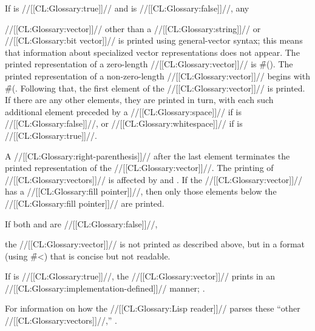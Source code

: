 \endsubsubsection%


If  is //[[CL:Glossary:true]]//  and  is //[[CL:Glossary:false]]//, any

//[[CL:Glossary:vector]]//  other than a //[[CL:Glossary:string]]// or //[[CL:Glossary:bit vector]]// is printed using general-vector syntax; this means that information about specialized vector representations does not appear. The printed representation of a zero-length //[[CL:Glossary:vector]]// is \f{\#()}. The printed representation of a non-zero-length //[[CL:Glossary:vector]]// begins with \f{\#(}. Following that, the first element of the //[[CL:Glossary:vector]]// is printed.    If there are any other elements, they are printed in turn, with  each such additional element preceded by a //[[CL:Glossary:space]]// if  is //[[CL:Glossary:false]]//, or //[[CL:Glossary:whitespace]]// if  is //[[CL:Glossary:true]]//.

A //[[CL:Glossary:right-parenthesis]]// after the last element terminates the printed representation of the //[[CL:Glossary:vector]]//.  The printing of //[[CL:Glossary:vectors]]//  is affected by  and . If the //[[CL:Glossary:vector]]// has a //[[CL:Glossary:fill pointer]]//,  then only those elements below the //[[CL:Glossary:fill pointer]]// are printed.


If both  and  are //[[CL:Glossary:false]]//,

the //[[CL:Glossary:vector]]// is not printed as described above, but in a format (using \f{\#<}) that is concise but not readable.

 If  is //[[CL:Glossary:true]]//, the //[[CL:Glossary:vector]]// prints in an //[[CL:Glossary:implementation-defined]]// manner; .

For information on how the //[[CL:Glossary:Lisp reader]]// parses these ``other //[[CL:Glossary:vectors]]//,'' \seesection\SharpsignLeftParen.

\endsubsubsection%

